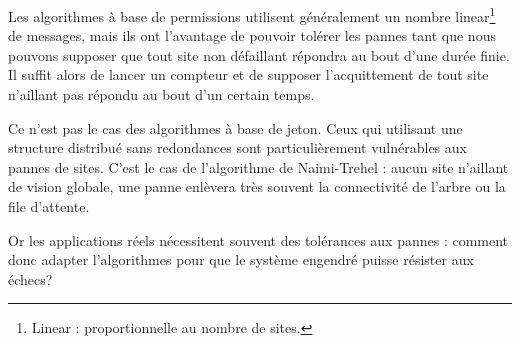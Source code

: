 Les algorithmes à base de permissions utilisent généralement un nombre linear\footnote{ Linear : proportionnelle au nombre de sites. } de messages, mais ils ont l'avantage de pouvoir tolérer les pannes tant que nous pouvons supposer que tout site non défaillant répondra au bout d'une durée finie. Il suffit alors de lancer un compteur et de supposer l'acquittement de tout site n'aillant pas répondu au bout d'un certain temps.

Ce n'est pas le cas des algorithmes à base de jeton. Ceux qui utilisant une structure distribué sans redondances sont particulièrement vulnérables aux pannes de sites. C'est le cas de l'algorithme de Naimi-Trehel : aucun site n'aillant de vision globale, une panne enlèvera très souvent la connectivité de l'arbre ou la file d'attente.

Or les applications réels nécessitent souvent des tolérances aux pannes : comment donc adapter l'algorithmes pour que le système engendré puisse résister aux échecs?